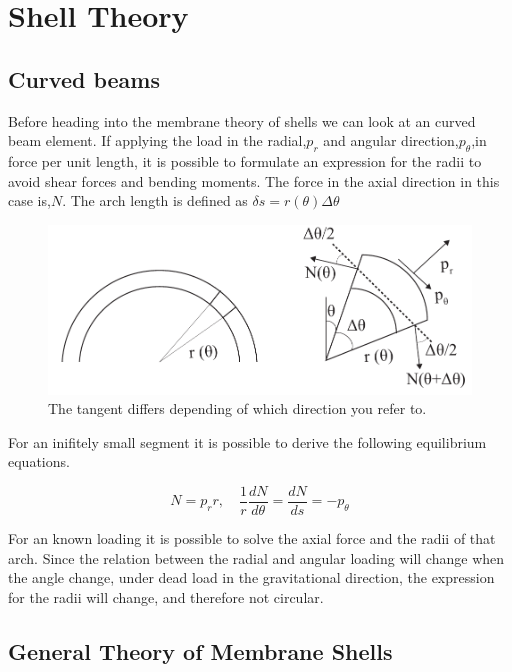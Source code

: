 \section{Shell Theory}




\subsection{Curved beams}

Before heading into the membrane theory of shells we can look at an curved beam element. If applying the load in the radial,$p_r$ and angular direction,$p_\theta$,in force per unit length, it is possible to formulate an expression for the radii to avoid shear forces and bending moments. The force in the axial direction in this case is,$N$. The arch length is defined as $\delta s = r(\theta)\Delta\theta $

\begin{figure}[H]
\centering
\includegraphics[width=0.9\linewidth ]{figure/Theory/CurvedBeam3.pdf}
\caption{The tangent differs depending of which direction you refer to. }
\end{figure}

For an inifitely small segment it is possible to derive the following equilibrium equations.

\begin{equation}
N = p_r r,\quad \frac{1}{r} \frac{dN}{d\theta} = \frac{dN}{ds} = - p_\theta
\end{equation}

For an known loading it is possible to solve the axial force and the radii of that arch. Since the relation between the radial and angular loading will change when the angle change, under dead load in the gravitational direction, the expression for the radii will change, and therefore not circular. 

\subsection{General Theory of Membrane Shells}


